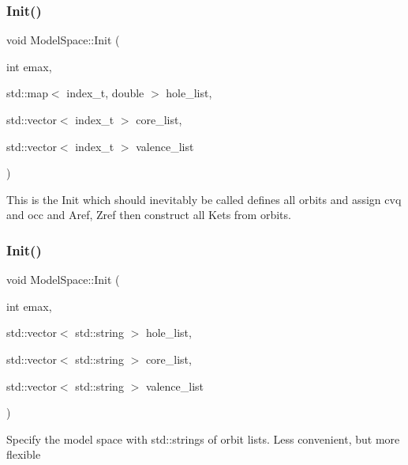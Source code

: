\subsubsection{\texorpdfstring{Init()}{Init()}\hspace{0.1cm}{\footnotesize\ttfamily [2/3]}}
{\footnotesize\ttfamily void Model\+Space\+::\+Init (\begin{DoxyParamCaption}\item[{int}]{emax,  }\item[{std\+::map$<$ index\+\_\+t, double $>$}]{hole\+\_\+list,  }\item[{std\+::vector$<$ index\+\_\+t $>$}]{core\+\_\+list,  }\item[{std\+::vector$<$ index\+\_\+t $>$}]{valence\+\_\+list }\end{DoxyParamCaption})}

This is the Init which should inevitably be called defines all orbits and assign cvq and occ and Aref, Zref then construct all Kets from orbits. \mbox{\label{classModelSpace_a53306cc577aed149cd5cdeefcb32a668}} 
\subsubsection{\texorpdfstring{Init()}{Init()}\hspace{0.1cm}{\footnotesize\ttfamily [3/3]}}
{\footnotesize\ttfamily void Model\+Space\+::\+Init (\begin{DoxyParamCaption}\item[{int}]{emax,  }\item[{std\+::vector$<$ std\+::string $>$}]{hole\+\_\+list,  }\item[{std\+::vector$<$ std\+::string $>$}]{core\+\_\+list,  }\item[{std\+::vector$<$ std\+::string $>$}]{valence\+\_\+list }\end{DoxyParamCaption})}

Specify the model space with std\+::strings of orbit lists. Less convenient, but more flexible \mbox{\label{classModelSpace_a3a73226c5f32007c36d6f193b353644d}} 

